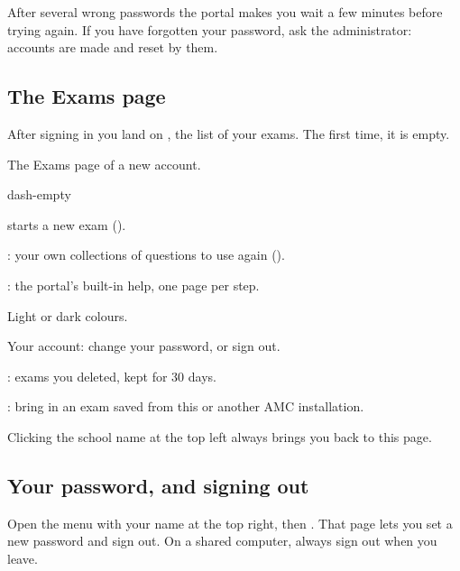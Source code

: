 \documentclass[11pt]{article}
\begin{document}
\begin{tip}
After several wrong passwords the portal makes you wait a few minutes before trying again. If you have forgotten your password, ask the administrator: accounts are made and reset by them.
\end{tip}

\subsection{The Exams page}\label{sec:exams-page}

After signing in you land on , the list of your exams. The first time, it is empty.

\begin{keep}
\begin{guidefig}{The Exams page of a new account.}
\begin{shot}{dash-empty}
\end{shot}
\end{guidefig}
\begin{callouts}
  \item {} starts a new exam ().
  \item {}: your own collections of questions to use again ().
  \item {}: the portal's built-in help, one page per step.
  \item Light or dark colours.
  \item Your account: change your password, or sign out.
  \item {}: exams you deleted, kept for 30 days.
  \item {}: bring in an exam saved from this or another AMC installation.
\end{callouts}
\end{keep}

Clicking the school name at the top left always brings you back to this page.

\subsection{Your password, and signing out}

Open the menu with your name at the top right, then . That page lets you set a new password and sign out. On a shared computer, always sign out when you leave.
\end{document}
